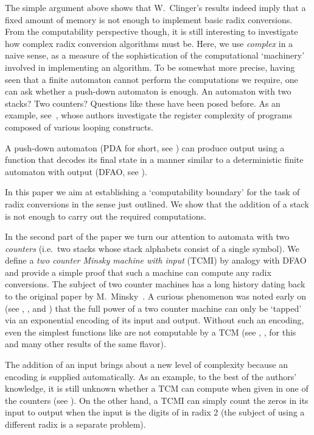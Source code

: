 \documentclass[12pt]{article}
\begin{document}
The simple argument above shows that W.~Clinger's results indeed imply
that a fixed amount of memory is not enough to implement basic radix
conversions. From the computability perspective
though, it is still interesting to investigate how complex radix
conversion algorithms must be. Here, we use {\it complex\/} in a naive
sense, as a measure of the sophistication of the computational
`machinery' involved in implementing an algorithm. To be somewhat more
precise, having seen that a finite automaton cannot perform the
computations we require, one can ask whether a push-down automaton is
enough. An automaton with two stacks? Two counters? Questions like
these have been posed before. As an example, see~\cite{holkutr}, whose authors
investigate the register complexity of programs composed of various
looping constructs.
 
A push-down automaton (PDA for short, see \cite{hum}) can produce output
using a function that decodes its final state
in a manner similar to a deterministic finite automaton with output (DFAO,
see \cite{Allouche}).

In this paper we aim at establishing a `computability boundary' for
the task of radix conversions in the sense just outlined. We show that
the addition of a stack is not enough to carry out the required
computations.

In the second part of the paper we turn our attention to automata with
two {\it counters\/} (i.e.~two stacks whose stack alphabets consist of
a single symbol). We define a {\it two counter Minsky machine with
  input\/} (TCMI) by analogy with DFAO and provide a simple proof that such a
machine can compute any radix conversions. The subject of two counter
machines has a long history dating back to the original paper by
M.~Minsky~\cite{Minsky}. A curious phenomenon was noted early on (see
\cite{Schroep}, \cite{Bardz}, and \cite{ibarra}) that the full power of
a two counter machine can only be `tapped' via an exponential encoding
of its input and output. Without such an encoding, even the simplest
functions like  are not computable by a TCM (see \cite{Schroep},
\cite{Bardz}, \cite{ibarra} for this and many other results of the same
flavor).

The addition of an input brings about a new level of complexity
because an encoding is supplied automatically. As an
example, to the best of the authors' knowledge, it is still unknown
whether a TCM can compute  when given  in one of the counters
(see \cite{Schroep}). On the other hand, a TCMI can simply count the
zeros in its input to output  when the input is the digits of
 in radix 2 (the subject of using a different radix is a separate
problem). 
\end{document}
